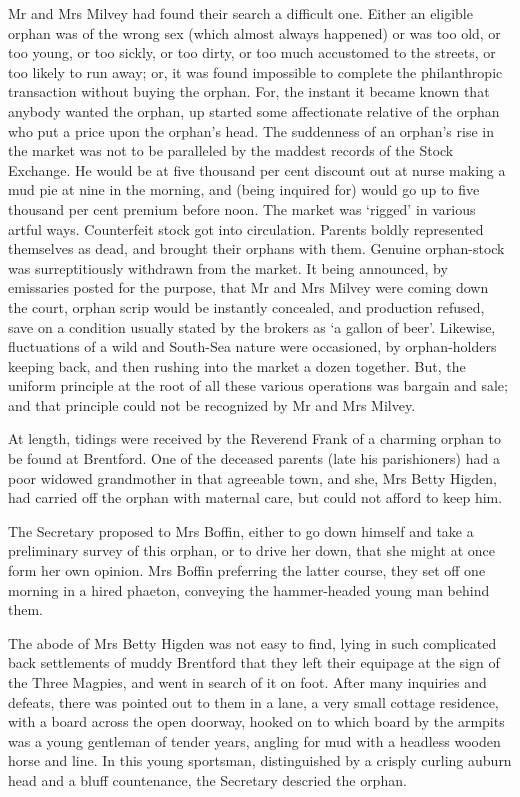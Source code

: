 Mr and Mrs Milvey had found their search a difficult one. Either an
eligible orphan was of the wrong sex (which almost always happened)
or was too old, or too young, or too sickly, or too dirty, or too much
accustomed to the streets, or too likely to run away; or, it was found
impossible to complete the philanthropic transaction without buying the
orphan. For, the instant it became known that anybody wanted the orphan,
up started some affectionate relative of the orphan who put a price upon
the orphan’s head. The suddenness of an orphan’s rise in the market was
not to be paralleled by the maddest records of the Stock Exchange. He
would be at five thousand per cent discount out at nurse making a mud
pie at nine in the morning, and (being inquired for) would go up to
five thousand per cent premium before noon. The market was ‘rigged’ in
various artful ways. Counterfeit stock got into circulation. Parents
boldly represented themselves as dead, and brought their orphans with
them. Genuine orphan-stock was surreptitiously withdrawn from the
market. It being announced, by emissaries posted for the purpose, that
Mr and Mrs Milvey were coming down the court, orphan scrip would be
instantly concealed, and production refused, save on a condition usually
stated by the brokers as ‘a gallon of beer’. Likewise, fluctuations of
a wild and South-Sea nature were occasioned, by orphan-holders keeping
back, and then rushing into the market a dozen together. But, the
uniform principle at the root of all these various operations was
bargain and sale; and that principle could not be recognized by Mr and
Mrs Milvey.

At length, tidings were received by the Reverend Frank of a charming
orphan to be found at Brentford. One of the deceased parents (late his
parishioners) had a poor widowed grandmother in that agreeable town, and
she, Mrs Betty Higden, had carried off the orphan with maternal care,
but could not afford to keep him.

The Secretary proposed to Mrs Boffin, either to go down himself and
take a preliminary survey of this orphan, or to drive her down, that
she might at once form her own opinion. Mrs Boffin preferring the latter
course, they set off one morning in a hired phaeton, conveying the
hammer-headed young man behind them.

The abode of Mrs Betty Higden was not easy to find, lying in such
complicated back settlements of muddy Brentford that they left their
equipage at the sign of the Three Magpies, and went in search of it on
foot. After many inquiries and defeats, there was pointed out to them
in a lane, a very small cottage residence, with a board across the open
doorway, hooked on to which board by the armpits was a young gentleman
of tender years, angling for mud with a headless wooden horse and line.
In this young sportsman, distinguished by a crisply curling auburn head
and a bluff countenance, the Secretary descried the orphan.

